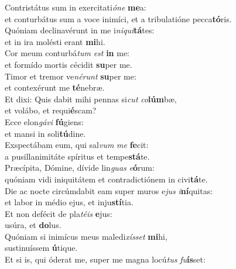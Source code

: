 \evenverse Contristátus sum in exercitati\textit{ó}\textit{ne} \textbf{me}a:~\*\\
\evenverse et conturbátus sum a voce inimíci, et a tribulatióne pecca\textbf{tó}ris.\\
\oddverse Quóniam declinavérunt in me i\textit{ni}\textit{qui}\textbf{tá}tes:~\*\\
\oddverse et in ira molésti erant \textbf{mi}hi.\\
\evenverse Cor meum conturbá\textit{tum} \textit{est} \textbf{in} me:~\*\\
\evenverse et formído mortis cécidit \textbf{su}per me.\\
\oddverse Timor et tremor ve\textit{né}\textit{runt} \textbf{su}per me:~\*\\
\oddverse et contexérunt me \textbf{té}nebræ.\\
\evenverse Et dixi: Quis dabit mihi pennas si\textit{cut} \textit{co}\textbf{lúm}bæ,~\*\\
\evenverse et volábo, et requi\textbf{é}scam?\\
\oddverse Ecce elon\textit{gá}\textit{vi} \textbf{fú}giens:~\*\\
\oddverse et mansi in soli\textbf{tú}dine.\\
\evenverse Exspectábam eum, qui sal\textit{vum} \textit{me} \textbf{fe}cit:~\*\\
\evenverse a pusillanimitáte spíritus et tempe\textbf{stá}te.\\
\oddverse Præcípita, Dómine, dívide lin\textit{guas} \textit{e}\textbf{ó}rum:~\*\\
\oddverse quóniam vidi iniquitátem et contradictiónem in civi\textbf{tá}te.\\
\evenverse Die ac nocte circúmdabit eam super muros e\textit{jus} \textit{i}\textbf{ní}quitas:~\*\\
\evenverse et labor in médio ejus, et inju\textbf{stí}tia.\\
\oddverse Et non defécit de pla\textit{té}\textit{is} \textbf{e}jus:~\*\\
\oddverse usúra, et \textbf{do}lus.\\
\evenverse Quóniam si inimícus meus maledi\textit{xís}\textit{set} \textbf{mi}hi,~\*\\
\evenverse sustinuíssem \textbf{ú}tique.\\
\oddverse Et si is, qui óderat me, super me magna locú\textit{tus} \textit{fu}\textbf{ís}set:~\*\\
